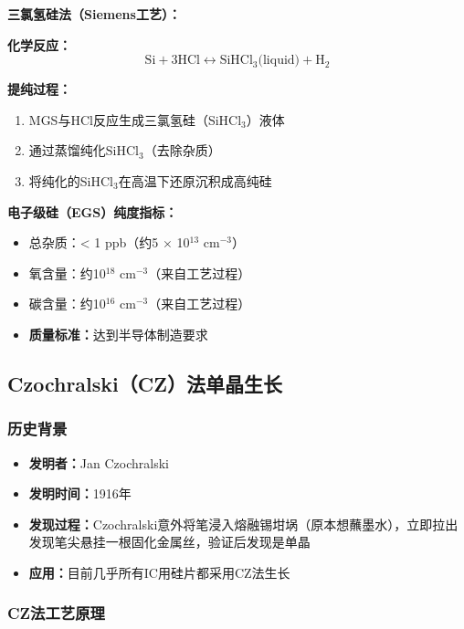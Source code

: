 \documentclass[UTF8,12pt,a4paper]{ctexart}
\begin{document}
\textbf{三氯氢硅法（Siemens工艺）：}

\textbf{化学反应：}
\begin{equation}
\text{Si} + 3\text{HCl} \leftrightarrow \text{SiHCl}_3\text{(liquid)} + \text{H}_2
\end{equation}

\textbf{提纯过程：}
\begin{enumerate}
    \item MGS与HCl反应生成三氯氢硅（SiHCl$_3$）液体
    \item 通过蒸馏纯化SiHCl$_3$（去除杂质）
    \item 将纯化的SiHCl$_3$在高温下还原沉积成高纯硅
\end{enumerate}

\textbf{电子级硅（EGS）纯度指标：}
\begin{itemize}
    \item 总杂质：< 1 ppb（约5 $\times$ 10$^{13}$ cm$^{-3}$）
    \item 氧含量：约10$^{18}$ cm$^{-3}$（来自工艺过程）
    \item 碳含量：约10$^{16}$ cm$^{-3}$（来自工艺过程）
    \item \textbf{质量标准：}达到半导体制造要求
\end{itemize}

\subsection{Czochralski（CZ）法单晶生长}

\subsubsection{历史背景}

\begin{itemize}
    \item \textbf{发明者：}Jan Czochralski
    \item \textbf{发明时间：}1916年
    \item \textbf{发现过程：}Czochralski意外将笔浸入熔融锡坩埚（原本想蘸墨水），立即拉出发现笔尖悬挂一根固化金属丝，验证后发现是单晶
    \item \textbf{应用：}目前几乎所有IC用硅片都采用CZ法生长
\end{itemize}

\subsubsection{CZ法工艺原理}
\end{document}
